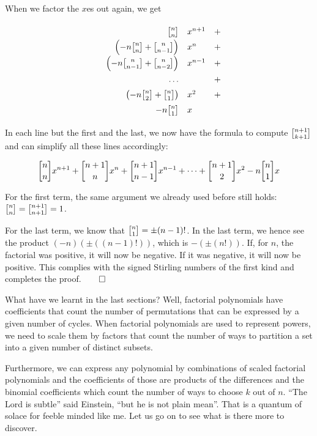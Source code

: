 \documentclass[tikz]{scrreprt}
\begin{document}
When we factor the $x$es out again, we get

\[
\begingroup
\renewcommand{\arraystretch}{1.5}
\begin{array}{crlc}
  &\stirlingOne{n}{n}                                      &x^{n+1}& + \\
  &\left(-n\stirlingOne{n}{n} + \stirlingOne{n}{n-1}\right)&x^n    & + \\
  &\left(-n\stirlingOne{n}{n-1}+\stirlingOne{n}{n-2}\right)&x^{n-1}& + \\
  & \dots                                                  &       & + \\
  &\left(-n\stirlingOne{n}{2} + \stirlingOne{n}{1}\right)  &x^{2}  & + \\
  &-n\stirlingOne{n}{1}                                    &x      & 
\end{array}
\endgroup
\]

In each line but the first and the last, we now have
the formula to compute $\stirlingOne{n+1}{k+1}$ and
can simplify all these lines accordingly:

\[
\stirlingOne{n}{n}x^{n+1} + 
\stirlingOne{n+1}{n}x^n  + 
\stirlingOne{n+1}{n-1}x^{n-1} + 
\dots + 
\stirlingOne{n+1}{2}x^{2} 
-n \stirlingOne{n}{1}x
\]

For the first term, the same argument 
we already used before still holds:
$\stirlingOne{n}{n} = \stirlingOne{n+1}{n+1} = 1$.

For the last term, we know that 
$\stirlingOne{n}{1} = \pm(n-1)!$.
In the last term, we hence see the product 
$(-n)(\pm((n-1)!))$, which is $-(\pm(n!))$.
If, for $n$, the factorial was positive,
it will now be negative. If it was negative,
it will now be positive.
This complies with the signed Stirling numbers
of the first kind and completes the proof.$\qed$

What have we learnt in the last sections?
Well, factorial polynomials have coefficients
that count the number of permutations
that can be expressed by a given number of cycles.
When factorial polynomials are used to represent
powers, we need to scale them by factors
that count the number of ways to partition a set
into a given number of distinct subsets.

Furthermore, we can express any polynomial
by combinations of scaled factorial polynomials
and the coefficients of those
are products of the differences and
the binomial coefficients which count
the number of ways to choose $k$ out of $n$.
``The Lord is subtle'' said Einstein,
``but he is not plain mean''.
That is a quantum of solace for feeble minded
like me. Let us go on to see
what is there more to discover.
\end{document}
